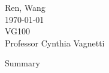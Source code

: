 \documentclass[12pt,a4]{article}
\begin{document}
\begin{flushleft}
Ren, Wang\\
\today\\
VG100\\
Professor Cynthia Vagnetti \\
\end{flushleft}

\begin{center}
Summary
\end{center}


\cite{asmemanual}




\end{document}
